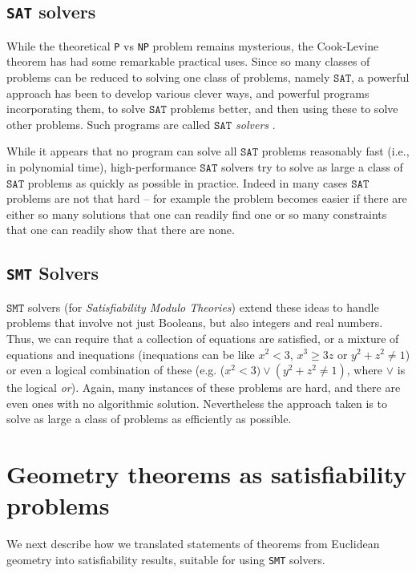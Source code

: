 \documentclass{amsart}
\theoremstyle{plain}
\theoremstyle{definition}
\theoremstyle{remark}
\begin{document}
\hypertarget{sat-solvers}{%
	\subsection{\texttt{SAT} solvers}\label{sat-solvers}}

While the theoretical \texttt{P} vs \texttt{NP} problem remains mysterious, the
Cook-Levine theorem has had some remarkable practical uses. Since so
many classes of problems can be reduced to solving one class of
problems, namely \(\texttt{SAT}\), a powerful approach has been to develop
various clever ways, and powerful programs incorporating them, to solve
\(\texttt{SAT}\) problems better, and then using these to solve other problems.
Such programs are called \emph{\(\texttt{SAT}\) solvers} .


While it appears that no program can solve all \(\texttt{SAT}\) problems
reasonably fast (i.e., in polynomial time), high-performance \(\texttt{SAT}\)
solvers try to solve as large a class of \(\texttt{SAT}\) problems as quickly as
possible in practice. Indeed in many cases \(\texttt{SAT}\) problems are not that
hard -- for example the problem becomes easier if there are either so
many solutions that one can readily find one or so many constraints that
one can readily show that there are none.

\subsection{\texttt{SMT} Solvers}
\(\texttt{SMT}\) solvers (for \emph{Satisfiability Modulo Theories}) extend these
ideas to handle problems that involve not just Booleans, but also
integers and real numbers. Thus, we can require that a collection of
equations are satisfied, or a mixture of equations and inequations
(inequations can be like \(x^2 < 3\), \(x^3 \geq 3z\) or
\(y^2 + z^2 \neq 1\)) or even a logical combination of these (e.g.
(\(x^2 < 3)\vee(y^2 + z^2 \neq 1)\), where \(\vee\) is the logical
\emph{or}). Again, many instances of these problems are hard, and there
are even ones with no algorithmic solution. Nevertheless the approach
taken is to solve as large a class of problems as efficiently as
possible.


\section{Geometry theorems as satisfiability problems}

We next describe how we translated statements of theorems from 
Euclidean geometry into satisfiability results, suitable for using \texttt{SMT} solvers.
\end{document}
